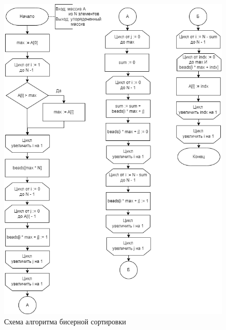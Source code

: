 \documentclass[a4paper,14pt, unknownkeysallowed]{extreport}
\begin{document}
\begin{figure}[h!]
	\centering
	\includegraphics[width=1\linewidth]{img/bead_sort.png}
	\caption{Схема алгоритма бисерной сортировки}
	\label{fig:bead_sort}
\end{figure}
	
\end{document}

